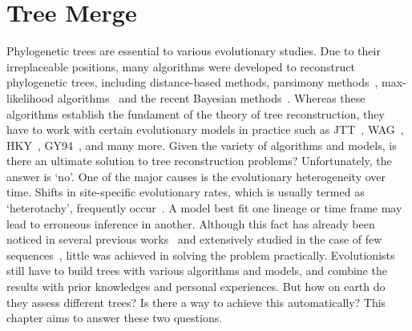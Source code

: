 \chapter{Tree Merge} \label{chap:merge}

Phylogenetic trees are essential to various evolutionary studies.
Due to their irreplaceable positions, many algorithms were
developed to reconstruct phylogenetic trees, including distance-based
methods,
parsimony methods~\cite{fitch71},
max-likelihood algorithms~\cite{felsenstein81}
and the recent Bayesian methods~\cite{rannala96}.
Whereas these algorithms establish the fundament of
the theory of tree reconstruction, they have to work with certain
evolutionary models in practice such as
JTT~\cite{jones92},
WAG~\cite{whelan01},
HKY~\cite{hasegawa85},
GY94~\cite{goldman94}, and many more.
Given the variety of algorithms and models, is there an ultimate solution
to tree reconstruction problems? Unfortunately, the answer is `no'.
One of the major causes is the evolutionary heterogeneity over time.
Shifts in site-specific evolutionary rates, which is usually termed
as `heterotachy', frequently occur~\cite{lopez02}.
A model best fit one lineage or time frame may lead to erroneous inference
in another. Although this fact has already been noticed in several previous
works~\cite{weiss03,susko02} and extensively studied in the case
of few sequences~\cite{kolaczkowski04,gadagkar05,spencer05,philippe05},
little was achieved in solving the problem practically. Evolutionists
still have to build trees with
various algorithms and models, and combine the results with prior
knowledges and personal experiences. But how on earth do they
assess different trees? Is there a way to achieve this automatically?
This chapter aims to answer these two questions.

